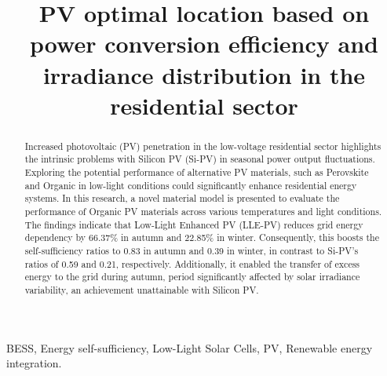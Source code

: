 \documentclass[conference]{IEEEtran}
\begin{document}


\title{PV optimal location based on power conversion efficiency and irradiance distribution in the residential sector\\
}

\author{
\and
{}
\and
{}
\and
{}
}
\maketitle
\begin{abstract}
  Increased photovoltaic (PV) penetration in the low-voltage residential sector highlights the intrinsic problems with Silicon PV (Si-PV) in seasonal power output fluctuations.
  Exploring the potential performance of alternative PV materials, such as Perovskite and Organic in low-light conditions could significantly enhance residential energy systems. 
  In this research, a novel material model is presented to evaluate the performance of Organic PV materials across various temperatures and light conditions. 
  The findings indicate that Low-Light Enhanced PV (LLE-PV) reduces grid energy dependency by 66.37\% in autumn and 22.85\% in winter.
  Consequently, this boosts the self-sufficiency ratios to 0.83 in autumn and 0.39 in winter, in contrast to Si-PV's ratios of 0.59 and 0.21, respectively.
  Additionally, it enabled the transfer of excess energy to the grid during autumn, period significantly affected by solar irradiance variability, an achievement unattainable with Silicon PV.
\end{abstract}

\begin{IEEEkeywords}
  BESS, Energy self-sufficiency, Low-Light Solar Cells, PV, Renewable energy integration.
\end{IEEEkeywords}





\end{document}
